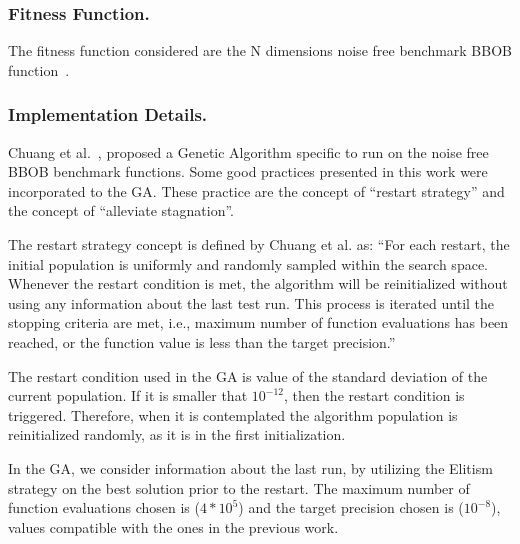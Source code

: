 \subsubsection*{Fitness Function.}
The fitness function considered are the N dimensions noise free benchmark BBOB function~\cite{hansen2010real}.


\subsubsection*{Implementation Details.}
Chuang et al.~\cite{chuang2012black}, proposed a Genetic Algorithm specific to run on the noise free BBOB benchmark functions. Some good practices presented in this work were incorporated to the GA. These practice are the concept of ``restart strategy'' and the concept of ``alleviate stagnation''.

The restart strategy concept is defined by Chuang et al. as: ``For each restart, the initial population  is uniformly and randomly sampled within the search space. Whenever the restart condition is met, the algorithm will be reinitialized without using any information about the last test run. This process is iterated until the stopping criteria are met, i.e., maximum number of function evaluations has been reached, or the function value is less than the target precision.''

The restart condition used in the GA is value of the standard deviation of the current population. If it is smaller that $10^{-12}$, then the restart condition is triggered. Therefore, when it is contemplated the algorithm population is reinitialized randomly, as it is in the first initialization. 

In the GA, we consider information about the last run, by utilizing the Elitism strategy on the best solution prior to the restart. The maximum number of function evaluations chosen is ($4 * 10^5$) and the target precision chosen is ($10^{-8}$), values compatible with the ones in the previous work.

